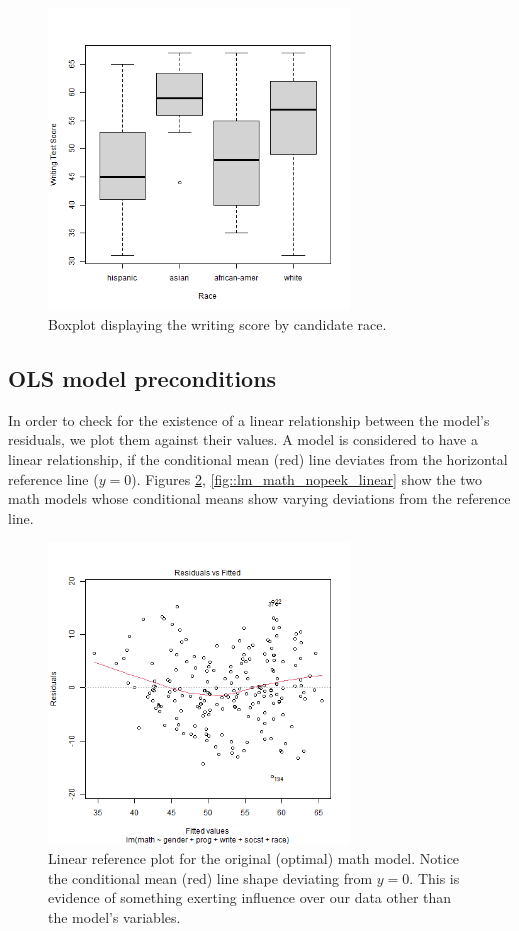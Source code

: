 \documentclass[10pt, a4paper]{article}
\begin{document}
	\begin{figure}[h]
		\includegraphics[width=8cm]{write_race_boxplot.png}
		\centering
		\caption{Boxplot displaying the writing score by candidate race.}
		\label{fig::write_race_boxplot}
	\end{figure}
	
	
	\subsection{OLS model preconditions}
	
	In order to check for the existence of a linear relationship between the model's residuals, we plot them against their values. A model is considered to have a linear relationship, if the conditional mean (red) line deviates from the horizontal reference line ($y=0$). Figures \ref{fig::lm_math_linear}, \ref{fig::lm_math_nopeek_linear} show the two math models whose conditional means show varying deviations from the reference line.
	
	\begin{figure}
		\includegraphics[width=8cm]{lm_math_linear_plot.png}
		\centering
		\caption{Linear reference plot for the original (optimal) math model. Notice the conditional mean (red) line shape deviating from $y=0$. This is evidence of something exerting influence over our data other than the model's variables.}
		\label{fig::lm_math_linear}
	\end{figure}
\end{document}
